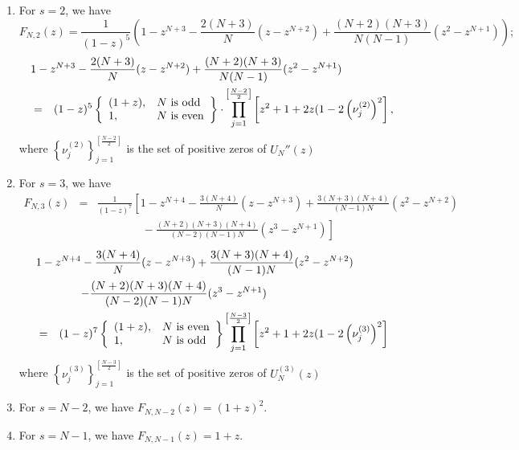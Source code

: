 \documentclass[12pt]{article}
\newcommand{\pa}[1]{\left(#1\right)}
\newcommand{\br}[1]{\left[#1\right]}
\newcommand{\cb}[1]{\left\{#1\right\}}
\begin{document}
\begin{enumerate}
\item For $s = 2$, we have
\begin{displaymath}
F_{N,2}(z) = \frac{1}{(1 - z)^5}\pa{1 - z^{N + 3} - \frac{2(N + 3)}{N}(z - z^{N + 2}) + \frac{(N + 2)(N + 3)}{N(N - 1)}(z^2 - z^{N + 1})};
\end{displaymath}
\begin{eqnarray*}
\lefteqn{1 - z^{N + 3} - \frac{2(N + 3)}{N}(z - z^{N + 2}) + \frac{(N + 2)(N + 3)}{N(N - 1)}(z^2 - z^{N + 1})} \\
&=& ( 1- z)^5\left\{\begin{array}{ll}
(1 + z), & N \mbox{ is odd} \\
1, & N \mbox{ is even}
\end{array}\right\} \cdot
\prod_{j = 1}^{\br{\frac{N - 2}{2}}}\br{z^2 + 1 + 2z(1 - 2\pa{\nu_j^{(2)}}^2},
\end{eqnarray*}
where $\cb{\nu_j^{(2)}}_{j = 1}^{\br{\frac{N - 2}{2}}}$ is the set of positive zeros of $U_N''(z)$

\item For $s = 3$, we have
\begin{eqnarray*}
F_{N,3}(z) &=& \frac{1}{(1 - z)^7}\left[1 - z^{N + 4} - \frac{3(N + 4)}{N}(z - z^{N + 3}) + \frac{3(N + 3)(N + 4)}{(N - 1)N}(z^2 - z^{N + 2})\right. \\
& & \qquad \qquad - \left.\frac{(N + 2)(N + 3)(N + 4)}{(N -  2)(N - 1)N}(z^3 - z^{N + 1}) \right]
\end{eqnarray*}
\begin{eqnarray*}
\lefteqn{1 - z^{N + 4} - \frac{3(N + 4)}{N}(z - z^{N + 3}) + \frac{3(N + 3)(N + 4)}{(N - 1)N}(z^2 - z^{N + 2})} \\
\lefteqn{\qquad \qquad - \frac{(N + 2)(N + 3)(N + 4)}{(N -  2)(N - 1)N}(z^3 - z^{N + 1})} \\
&=& (1 - z)^7\left\{\begin{array}{ll}
(1 + z), & N \mbox{ is even} \\
1, & N \mbox{ is odd}
\end{array}\right\}
\prod_{j = 1}^{\br{\frac{N - 3}{2}}}\br{z^2 + 1 + 2z(1 - 2\pa{\nu_j^{(3)}}^2}
\end{eqnarray*}
where $\cb{\nu_j^{(3)}}_{j = 1}^{\br{\frac{N - 3}{2}}}$ is the set of positive zeros of $U_N^{(3)}(z)$

\item For $s = N - 2$, we have $F_{N,N - 2}(z) = (1 + z)^2$.

\item For $s = N - 1$, we have $F_{N,N - 1}(z) = 1 + z$.
\end{enumerate}
\end{document}

